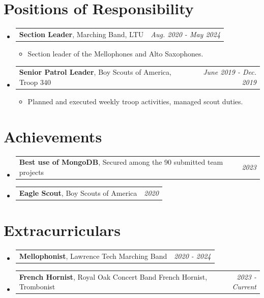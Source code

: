 \documentclass[a4paper,11pt]{article}
\makeatletter
\newcommand{\resumePOR}[3]{
\vspace{0.5mm}\item
    \begin{tabular*}{0.97\textwidth}[t]{l@{\extracolsep{\fill}}r}
        \textbf{#1},\hspace{0.3mm}#2 & \textit{\small{#3}} 
    \end{tabular*}
    \vspace{-2mm}
}
\newcommand{\resumeSubHeadingListStart}{\begin{itemize}[leftmargin=*,labelsep=0mm]}
\newcommand{\resumeItemListStart}{\begin{justify}\begin{itemize}[leftmargin=3ex, rightmargin=2ex, noitemsep,labelsep=1.2mm,itemsep=0mm]\small}
\newcommand{\resumeSubHeadingListEnd}{\end{itemize}\vspace{2mm}}
\newcommand{\resumeItemListEnd}{\end{itemize}\end{justify}\vspace{-2mm}}
\makeatother
\begin{document}
\section{Positions of Responsibility}
\vspace{-0.4mm}
\resumeSubHeadingListStart
\resumePOR{Section Leader} %
    { Marching Band, LTU} %
    {Aug. 2020 - May 2024} %
    \resumeItemListStart
        \item {Section leader of the Mellophones and Alto Saxophones.}
    \resumeItemListEnd
\resumePOR{Senior Patrol Leader} %
    { Boy Scouts of America, Troop 340} %
    {June 2019 - Dec. 2019} %
    \resumeItemListStart
        \item {Planned and executed weekly troop activities, managed scout duties.}
    \resumeItemListEnd
\resumeSubHeadingListEnd
\vspace{-6mm}

\section{Achievements}
\vspace{-0.2mm}
\resumeSubHeadingListStart
\resumePOR{Best use of MongoDB} %
    { Secured among the 90 submitted team projects} %
    {2023} %
\resumePOR{Eagle Scout} %
    { Boy Scouts of America} %
    {2020} %

\resumeSubHeadingListEnd
\vspace{-2mm}
\section{Extracurriculars}
\vspace{-0.4mm}
\resumeSubHeadingListStart
\resumePOR{Mellophonist} %
    { Lawrence Tech Marching Band} %
    {2020 - 2024} %
\resumePOR{French Hornist} %
    { Royal Oak Concert Band French Hornist, Trombonist} %
    {2023 - Current} %
\resumeSubHeadingListEnd
\vspace{-4mm}

\end{document}
